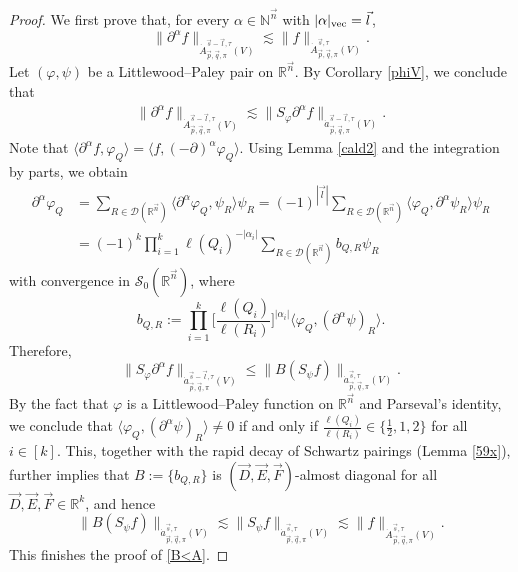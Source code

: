 \documentclass[11pt, reqno]{amsart}
\theoremstyle{definition}
\theoremstyle{remark}
\numberwithin{equation}{section}
\newcommand{\R}{\mathbb R}
\newcommand{\vn}{\vec n}
\newcommand{\vp}{\vec p}
\newcommand{\vq}{\vec q}
\newcommand{\vs}{\vec s}
\newcommand{\Atau}{\dot A^{\vs,\tau}_{\vp,\vq,\pi}}
\begin{document}
\begin{proof}
We first prove that, for every $\alpha\in \mathbb N^{\vec n}$ with $|\alpha|_{\rm{vec}}=\vec l$,
\begin{equation}\label{B<A}
\|\partial^{\alpha} f\|_{\dot A_{\vec p,\vec q,\pi}^{\vec s-\vec l,\tau}(V)}
\lesssim \|f\|_{\Atau(V)}.
\end{equation}
Let $(\varphi,\psi)$ be a Littlewood--Paley pair on $\R^{\vn}$.
By Corollary \ref{phiV}, we conclude that
\begin{align*}
\|\partial^{\alpha} f\|_{\dot A_{\vec p,\vec q,\pi}^{\vec s-\vec l,\tau}(V)}
\lesssim\|S_\varphi\partial^{\alpha} f\|_{\dot a_{\vec p,\vec q,\pi}^{\vec s-\vec l,\tau}(V)}.
\end{align*}
Note that $\langle\partial^{\alpha} f,\varphi_Q\rangle
=\langle f,(-\partial)^{\alpha} \varphi_Q\rangle.$
Using Lemma \ref{cald2} and the integration by parts, we obtain
\begin{align*}
\partial^{\alpha} \varphi_Q
&=\sum_{R\in\mathscr D(\mathbb R^{\vec n})}
\langle\partial^{\alpha} \varphi_Q,\psi_R\rangle \psi_R
=(-1)^{|\vec l|}\sum_{R\in\mathscr D(\mathbb R^{\vec n})}
\langle\varphi_Q,\partial^{\alpha} \psi_R\rangle \psi_R\\
&=(-1)^k \prod_{i=1}^k \ell(Q_i)^{-|\alpha_i|}
\sum_{R\in\mathscr D(\mathbb R^{\vec n})}
b_{Q,R} \psi_R
\end{align*}
with convergence in $\mathscr S_0(\mathbb R^{\vec n})$, where
$$
b_{Q,R}:= \prod_{i=1}^k \bigg[\frac{\ell(Q_i)}{\ell(R_i)}\bigg]^{|\alpha_i|}
\langle\varphi_Q,(\partial^{\alpha} \psi)_R\rangle.
$$
Therefore,
$$
\|S_\varphi\partial^{\alpha} f\|_{\dot a_{\vec p,\vec q,\pi}^{\vec s-\vec l,\tau}(V)}
\leq \|B (S_\psi f)\|_{\dot a_{\vec p,\vec q,\pi}^{\vec s,\tau}(V)}.
$$
By the fact that $\varphi$ is a Littlewood--Paley function on $\R^{\vn}$
and Parseval's identity,
we conclude that $\langle\varphi_Q,(\partial^{\alpha} \psi)_R\rangle\neq 0$
if and only if $\frac{\ell(Q_i)}{\ell(R_i)}\in\{\frac12,1,2\}$ for all $i\in[k]$.
This, together with the rapid decay of Schwartz pairings (Lemma \ref{59x}),
further implies that $B:=\{b_{Q,R}\}$ is $(\vec D, \vec E,\vec F)$-almost diagonal
for all $\vec D, \vec E,\vec F\in \R^k$,
and hence
$$
\|B (S_\psi f)\|_{\dot a_{\vec p,\vec q,\pi}^{\vec s,\tau}(V)}
\lesssim \|S_\psi f\|_{\dot a_{\vec p,\vec q,\pi}^{\vec s,\tau}(V)}
\lesssim \|f\|_{\dot A_{\vec p,\vec q,\pi}^{\vec s,\tau}(V)}.
$$
This finishes the proof of \eqref{B<A}.


\end{proof}
\end{document}
